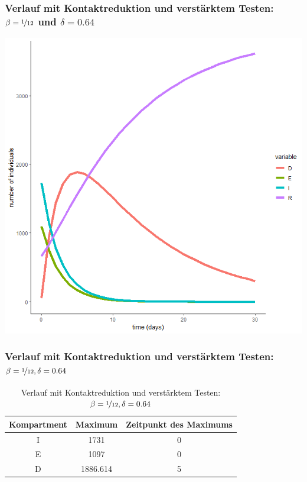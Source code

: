 \documentclass{beamer}
\begin{document}
\begin{frame}
	\frametitle{Verlauf mit Kontaktreduktion und verstärktem Testen: $\beta = \nicefrac{1}{12}$ und $\delta = 0.64$}
	\begin{center}
		\includegraphics[scale=0.45]{delta=0,64,beta=1durch12,ohne_s.png}
	\end{center}
\end{frame}

\begin{frame}
	\frametitle{Verlauf mit Kontaktreduktion und verstärktem Testen: $\beta = \nicefrac{1}{12}, \delta = 0.64$}
	\begin{table}[h]
		\caption{Verlauf mit Kontaktreduktion und verstärktem Testen: $\beta = \nicefrac{1}{12}, \delta = 0.64$}
		\centering
		\begin{tabular}{@{}ccc@{}}
			\toprule
			Kompartment & Maximum & Zeitpunkt des Maximums\\ 
			\midrule
			I & 1731 & 0\\ 
			E & 1097 & 0\\ 
			D & 1886.614 &  5\\ 
			\bottomrule
		\end{tabular}
	\end{table}
\end{frame}
\end{document}
